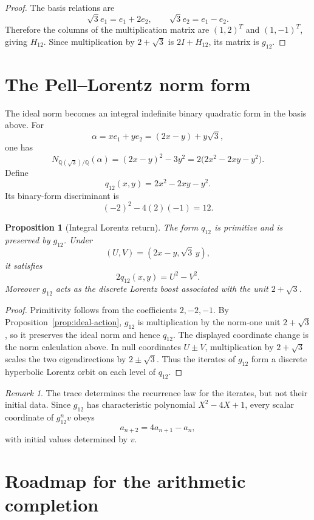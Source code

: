 \documentclass[11pt]{article}
\newtheorem{proposition}[theorem]{Proposition}
\theoremstyle{definition}
\theoremstyle{remark}
\newtheorem{remark}[theorem]{Remark}
\newcommand{\Q}{\mathbb Q}
\begin{document}
\begin{proof}
The basis relations are
\[
\sqrt3e_1=e_1+2e_2,
\qquad
\sqrt3e_2=e_1-e_2.
\]
Therefore the columns of the multiplication matrix are $(1,2)^T$ and
$(1,-1)^T$, giving $H_{12}$.  Since multiplication by $2+\sqrt3$ is
$2I+H_{12}$, its matrix is $g_{12}$.
\end{proof}

\section{The Pell--Lorentz norm form}

The ideal norm becomes an integral indefinite binary quadratic form in the
basis above.  For
\[
\alpha=xe_1+ye_2=(2x-y)+y\sqrt3,
\]
one has
\[
N_{\Q(\sqrt3)/\Q}(\alpha)
=(2x-y)^2-3y^2
=2\bigl(2x^2-2xy-y^2\bigr).
\]
Define
\[
q_{12}(x,y)=2x^2-2xy-y^2.
\]
Its binary-form discriminant is
\[
(-2)^2-4(2)(-1)=12.
\]

\begin{proposition}[Integral Lorentz return]
\label{prop:lorentz-return}
The form $q_{12}$ is primitive and is preserved by $g_{12}$.  Under
\[
(U,V)=(2x-y,\sqrt3\,y),
\]
it satisfies
\[
\boxed{2q_{12}(x,y)=U^2-V^2.}
\]
Moreover $g_{12}$ acts as the discrete Lorentz boost associated with the unit
$2+\sqrt3$.
\end{proposition}

\begin{proof}
Primitivity follows from the coefficients $2,-2,-1$.  By
Proposition~\ref{prop:ideal-action}, $g_{12}$ is multiplication by the norm-one
unit $2+\sqrt3$, so it preserves the ideal norm and hence $q_{12}$.  The
displayed coordinate change is the norm calculation above.  In null
coordinates $U\pm V$, multiplication by $2+\sqrt3$ scales the two eigendirections
by $2\pm\sqrt3$.  Thus the iterates of $g_{12}$ form a discrete hyperbolic
Lorentz orbit on each level of $q_{12}$.
\end{proof}

\begin{remark}
The trace determines the recurrence law for the iterates, but not their
initial data.  Since $g_{12}$ has characteristic polynomial
$X^2-4X+1$, every scalar coordinate of $g_{12}^nv$ obeys
\[
a_{n+2}=4a_{n+1}-a_n,
\]
with initial values determined by $v$.
\end{remark}

\section{Roadmap for the arithmetic completion}
\end{document}
